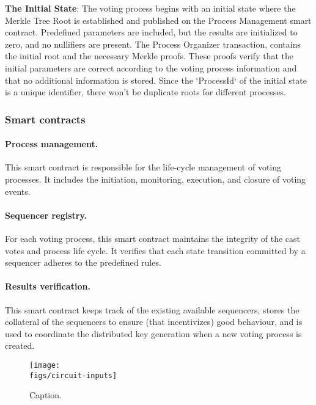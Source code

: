 \textbf{The Initial State}: The voting process begins with an initial state where the Merkle Tree Root is established and published on the Process Management smart contract. Predefined parameters are included, but the results are initialized to zero, and no nullifiers are present. The Process Organizer transaction, contains the initial root and the necessary Merkle proofs. These proofs verify that the initial parameters are correct according to the voting process information and that no additional information is stored. Since the `ProcessId` of the initial state is a unique identifier, there won't be duplicate roots for different processes.


\subsubsection{Smart contracts}

\paragraph{Process management.} This smart contract is responsible for the life-cycle management of voting processes. It includes the initiation, monitoring, execution, and closure of voting events.

\paragraph{Sequencer registry.} For each voting process, this smart contract maintains the integrity of the cast votes and process life cycle. It verifies that each state transition committed by a sequencer adheres to the predefined rules.

\paragraph{Results verification.} This smart contract keeps track of the existing available sequencers, stores the collateral of the sequencers to ensure (that incentivizes) good behaviour, and is used to coordinate the distributed key generation when a new voting process is created.\\



\begin{figure}[h]
	\centerline{\texttt{[image: \\figs/circuit-inputs]}}
	\caption{Caption.}
	\label{fig:circuit-inputs}
\end{figure}


